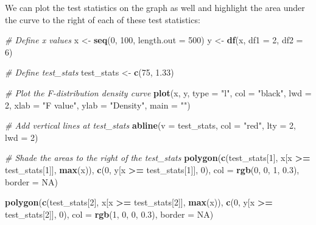 \documentclass[
  letterpaper,
]{book}
\newenvironment{Shaded}{\begin{snugshade}}{\end{snugshade}}
\newcommand{\AttributeTok}[1]{\textcolor[rgb]{0.13,0.29,0.53}{#1}}
\newcommand{\CommentTok}[1]{\textcolor[rgb]{0.56,0.35,0.01}{\textit{#1}}}
\newcommand{\ConstantTok}[1]{\textcolor[rgb]{0.56,0.35,0.01}{#1}}
\newcommand{\DecValTok}[1]{\textcolor[rgb]{0.00,0.00,0.81}{#1}}
\newcommand{\FloatTok}[1]{\textcolor[rgb]{0.00,0.00,0.81}{#1}}
\newcommand{\FunctionTok}[1]{\textcolor[rgb]{0.13,0.29,0.53}{\textbf{#1}}}
\newcommand{\NormalTok}[1]{#1}
\newcommand{\OtherTok}[1]{\textcolor[rgb]{0.56,0.35,0.01}{#1}}
\newcommand{\SpecialCharTok}[1]{\textcolor[rgb]{0.81,0.36,0.00}{\textbf{#1}}}
\newcommand{\StringTok}[1]{\textcolor[rgb]{0.31,0.60,0.02}{#1}}
\begin{document}
We can plot the test statistics on the graph as well and highlight the
area under the curve to the right of each of these test statistics:

\begin{Shaded}
\begin{Highlighting}[]
\CommentTok{\# Define x values}
\NormalTok{x }\OtherTok{\textless{}{-}} \FunctionTok{seq}\NormalTok{(}\DecValTok{0}\NormalTok{, }\DecValTok{100}\NormalTok{, }\AttributeTok{length.out =} \DecValTok{500}\NormalTok{)}
\NormalTok{y }\OtherTok{\textless{}{-}} \FunctionTok{df}\NormalTok{(x, }\AttributeTok{df1 =} \DecValTok{2}\NormalTok{, }\AttributeTok{df2 =} \DecValTok{6}\NormalTok{)}

\CommentTok{\# Define test\_stats}
\NormalTok{test\_stats }\OtherTok{\textless{}{-}} \FunctionTok{c}\NormalTok{(}\DecValTok{75}\NormalTok{, }\FloatTok{1.33}\NormalTok{)}

\CommentTok{\# Plot the F{-}distribution density curve}
\FunctionTok{plot}\NormalTok{(x, y, }\AttributeTok{type =} \StringTok{"l"}\NormalTok{, }\AttributeTok{col =} \StringTok{"black"}\NormalTok{, }\AttributeTok{lwd =} \DecValTok{2}\NormalTok{,}
     \AttributeTok{xlab =} \StringTok{"F value"}\NormalTok{, }\AttributeTok{ylab =} \StringTok{"Density"}\NormalTok{,}
     \AttributeTok{main =} \StringTok{""}\NormalTok{)}

\CommentTok{\# Add vertical lines at test\_stats}
\FunctionTok{abline}\NormalTok{(}\AttributeTok{v =}\NormalTok{ test\_stats, }\AttributeTok{col =} \StringTok{"red"}\NormalTok{, }\AttributeTok{lty =} \DecValTok{2}\NormalTok{, }\AttributeTok{lwd =} \DecValTok{2}\NormalTok{)}

\CommentTok{\# Shade the areas to the right of the test\_stats}
\FunctionTok{polygon}\NormalTok{(}\FunctionTok{c}\NormalTok{(test\_stats[}\DecValTok{1}\NormalTok{], x[x }\SpecialCharTok{\textgreater{}=}\NormalTok{ test\_stats[}\DecValTok{1}\NormalTok{]], }\FunctionTok{max}\NormalTok{(x)), }
        \FunctionTok{c}\NormalTok{(}\DecValTok{0}\NormalTok{, y[x }\SpecialCharTok{\textgreater{}=}\NormalTok{ test\_stats[}\DecValTok{1}\NormalTok{]], }\DecValTok{0}\NormalTok{), }\AttributeTok{col =} \FunctionTok{rgb}\NormalTok{(}\DecValTok{0}\NormalTok{, }\DecValTok{0}\NormalTok{, }\DecValTok{1}\NormalTok{, }\FloatTok{0.3}\NormalTok{), }\AttributeTok{border =} \ConstantTok{NA}\NormalTok{)}

\FunctionTok{polygon}\NormalTok{(}\FunctionTok{c}\NormalTok{(test\_stats[}\DecValTok{2}\NormalTok{], x[x }\SpecialCharTok{\textgreater{}=}\NormalTok{ test\_stats[}\DecValTok{2}\NormalTok{]], }\FunctionTok{max}\NormalTok{(x)), }
        \FunctionTok{c}\NormalTok{(}\DecValTok{0}\NormalTok{, y[x }\SpecialCharTok{\textgreater{}=}\NormalTok{ test\_stats[}\DecValTok{2}\NormalTok{]], }\DecValTok{0}\NormalTok{), }\AttributeTok{col =} \FunctionTok{rgb}\NormalTok{(}\DecValTok{1}\NormalTok{, }\DecValTok{0}\NormalTok{, }\DecValTok{0}\NormalTok{, }\FloatTok{0.3}\NormalTok{), }\AttributeTok{border =} \ConstantTok{NA}\NormalTok{)}


\end{Highlighting}
\end{Shaded}
\end{document}
